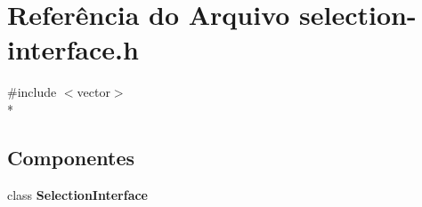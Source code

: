 \section{Referência do Arquivo selection-\/interface.h}
\label{selection-interface_8h}
{\ttfamily \#include $<$vector$>$}\\*
\subsection*{Componentes}
\begin{DoxyCompactItemize}
\item 
class {\bf Selection\+Interface}
\end{DoxyCompactItemize}
